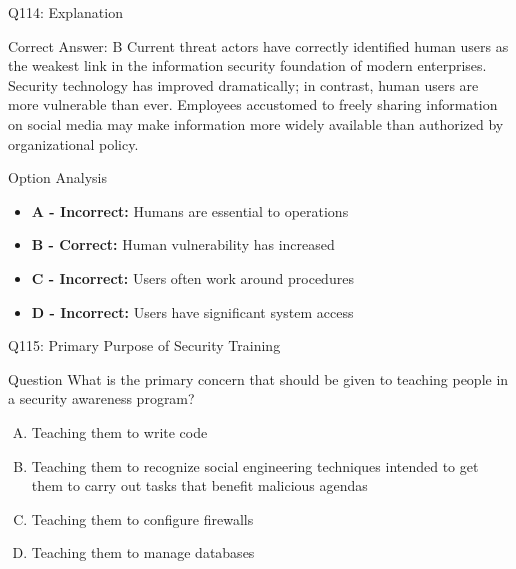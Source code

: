 \documentclass{beamer}
\begin{document}
	\begin{frame}{Q114: Explanation}
		\begin{block}{Correct Answer: B}
			Current threat actors have correctly identified human users as the weakest link in the information security foundation of modern enterprises. Security technology has improved dramatically; in contrast, human users are more vulnerable than ever. Employees accustomed to freely sharing information on social media may make information more widely available than authorized by organizational policy.
		\end{block}
		\begin{block}{Option Analysis}
			\begin{itemize}
				\item \textbf{A - Incorrect:} Humans are essential to operations
				\item \textbf{B - Correct:} Human vulnerability has increased
				\item \textbf{C - Incorrect:} Users often work around procedures
				\item \textbf{D - Incorrect:} Users have significant system access
			\end{itemize}
		\end{block}
	\end{frame}
	
	\begin{frame}{Q115: Primary Purpose of Security Training}
		\begin{block}{Question}
			What is the primary concern that should be given to teaching people in a security awareness program?
		\end{block}
		\begin{enumerate}[(A)]
			\item Teaching them to write code
			\item Teaching them to recognize social engineering techniques intended to get them to carry out tasks that benefit malicious agendas
			\item Teaching them to configure firewalls
			\item Teaching them to manage databases
		\end{enumerate}
	\end{frame}
	
\end{document}
